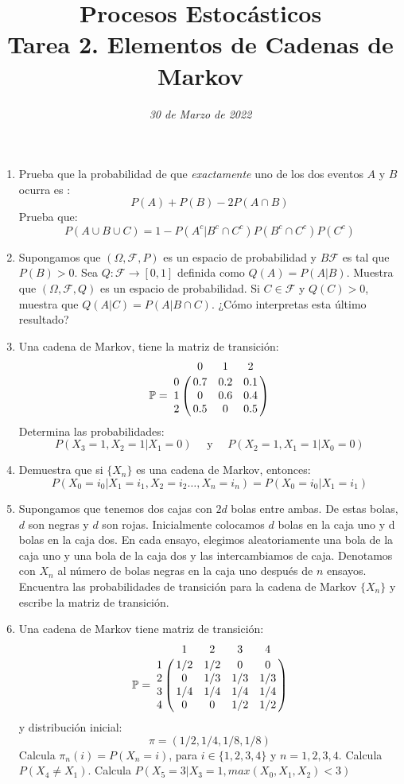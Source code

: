 \documentclass{article}
\title{{\LARGE Procesos Estocásticos}\\
{\Large \textbf{Tarea 2. Elementos de Cadenas de Markov}}}
\author{}
\date{\textit{30 de Marzo de 2022}}
\begin{document}
\maketitle
\begin{enumerate}
    \item Prueba que la probabilidad de que \emph{exactamente} uno de los dos eventos $A$ y $B$ ocurra es :
    $$
    P(A)+P(B)-2P(A\cap B)
    $$
    Prueba que:
    $$
    P(A\cup B\cup C) = 1-P(A^c\vert B^c\cap C^c)P(B^c\cap C^c)P(C^c)
    $$
    \item Supongamos que $(\Omega,\mathcal{F},P)$ es un espacio de probabilidad y $B\mathcal{F}$ es tal que $P(B)>0$. Sea $Q:\mathcal{F}\rightarrow [0,1]$ definida como $Q(A) = P(A\vert B)$. Muestra que $(\Omega, \mathcal{F},Q)$ es un espacio de probabilidad. Si $C\in\mathcal{F}$ y $Q(C)>0$, muestra que $Q(A\vert C) = P(A\vert B\cap C)$. ¿Cómo interpretas esta último resultado?
    \item Una cadena de Markov, tiene la matriz de transición:
    $$
    \mathbb{P} = \bordermatrix{
          & 0   & 1   & 2   \cr
        0 & 0.7 & 0.2 & 0.1 \cr
        1 & 0   & 0.6 & 0.4 \cr
        2 & 0.5 & 0   & 0.5 \cr
    }
    $$
    Determina las probabilidades:
    $$
    P(X_3 = 1, X_2 = 1 \vert X_1=0) \quad \mbox{ y }\quad P(X_2 = 1, X_1 = 1\vert X_0 = 0)
    $$
    \item Demuestra que si $\{X_n\}$ es una cadena de Markov, entonces:
    $$
    P(X_0=i_0\vert X_1 =i_1,X_2=i_2 \ldots,X_n=i_n) = P(X_0=i_0\vert X_1 =i_1)
    $$
    \item Supongamos que tenemos dos cajas con $2d$ bolas entre ambas. De estas bolas, $d$ son negras y $d$ son rojas. Inicialmente colocamos $d$ bolas en la caja uno y d bolas en la caja dos. En cada ensayo, elegimos aleatoriamente una bola de la caja uno y una bola de la caja dos y las intercambiamos de caja. Denotamos con $X_n$ al número de bolas negras en la caja uno después de $n$ ensayos. Encuentra las probabilidades de transición para la cadena de Markov $\{X_n\}$ y escribe la matriz de transición.
    \item Una cadena de Markov tiene matriz de transición:
    $$
    \mathbb{P} = \bordermatrix{
          & 1     & 2    & 3   & 4   \cr
        1 & 1/2   & 1/2  & 0   & 0   \cr
        2 & 0     & 1/3  & 1/3 & 1/3 \cr 
        3 & 1/4   & 1/4  & 1/4 & 1/4 \cr 
        4 & 0     & 0	 & 1/2 & 1/2 \cr 
    }
    $$
    y distribución inicial:
    $$
    \pi = (1/2, 1/4,1/8, 1/8)
    $$
    Calcula $\pi_n(i) = P(X_n = i)$, para $i\in \{1,2,3,4\}$ y  $n=1,2,3,4$. Calcula $P(X_4\neq X_1)$. Calcula $P(X_5 = 3\vert X_3 = 1,max(X_0,X_1,X_2)<3)$
\end{enumerate}
\end{document}
